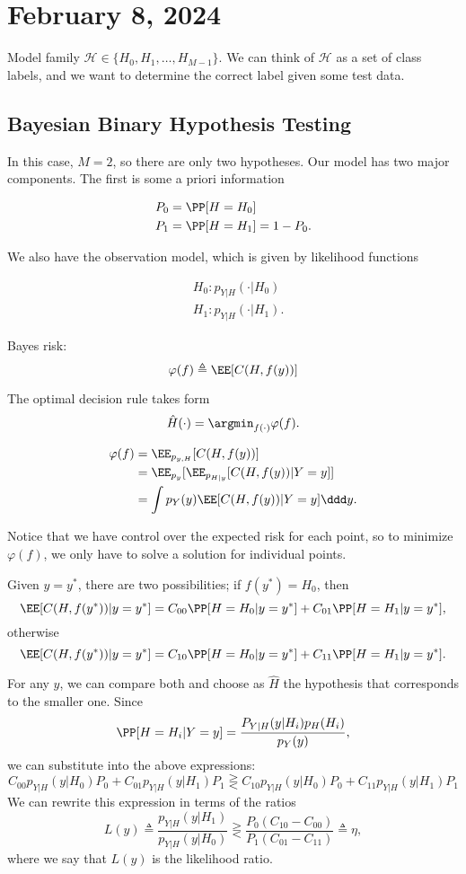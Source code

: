 \section{February 8, 2024}

Model family $\mathcal{H}\in \{H_0, H_1, \hdots, H_{M-1}\}$. We can think of $\mathcal{H}$ as a set of class labels, and we want to determine the correct label given some test data.

\subsection{Bayesian Binary Hypothesis Testing}

In this case, $M=2$, so there are only two hypotheses. Our model has two major components. The first is some a priori information 

\begin{align*}
	P_0 &= \PP[H=H_0] \\
	P_1 &= \PP[H=H_1] = 1 - P_0.
\end{align*}

We also have the observation model, which is given by likelihood functions

\begin{align*}
	&H_0: p_{Y|H}(\cdot | H_0) \\
	&H_1: p_{Y|H}(\cdot | H_1).
\end{align*}

Bayes risk:
\[\varphi(f) \triangleq \EE[C(H, f(y))]\] 

The optimal decision rule takes form 
\[\hat{H}(\cdot) = \argmin_{f(\cdot)}\varphi(f).\] 

\begin{align*}
	\varphi(f) &= \EE_{p_{y,H}}[C(H, f(y))] \\
						 &= \EE_{p_y}[\EE_{p_{H|y}}[C(H, f(y)) | Y=y]] \\
						 &= \int p_Y(y) \EE[C(H, f(y)) | Y=y] \ddd y.
\end{align*}

Notice that we have control over the expected risk for each point, so to minimize $\varphi(f)$, we only have to solve a solution for individual points. 

Given $y=y^*$, there are two possibilities; if $f(y^*) = H_0$, then 
\[\EE[C(H,f(y^*)) | y=y^*] = C_{00}\PP[H=H_0 | y=y^*] + C_{01}\PP[H=H_1 | y=y^*],\] 
otherwise
\[\EE[C(H, f(y^*)) | y=y^*] = C_{10}\PP[H=H_0 | y=y^*] + C_{11}\PP[H=H_1 | y=y^*].\] 

For any $y$, we can compare both and choose as $\hat{H}$ the hypothesis that corresponds to the smaller one. Since 
\[\PP[H=H_i | Y=y] = \frac{P_{Y|H}(y|H_i)p_{H}(H_i)}{p_Y(y)},\]
we can substitute into the above expressions: 
\[C_{00}p_{Y|H}(y|H_0)P_0 + C_{01}p_{Y|H}(y|H_1)P_1\gtreqless C_{10}p_{Y|H}(y|H_0)P_0 + C_{11}p_{Y|H}(y|H_1)P_1\] 
We can rewrite this expression in terms of the ratios 
\[L(y) \triangleq \frac{p_{Y|H}(y|H_1)}{p_{Y|H}(y|H_0)} \gtreqless \frac{P_0(C_{10}-C_{00})}{P_1(C_{01}-C_{11})} \triangleq \eta,\] 
where we say that $L(y)$ is the \ac{likelihood ratio}. 

